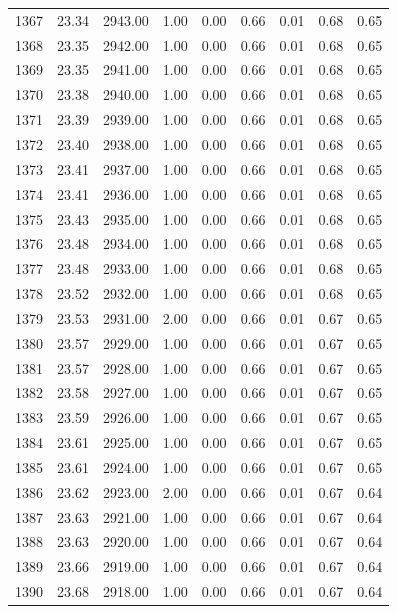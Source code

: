 \documentclass{article}\usepackage[]{graphicx}\usepackage[]{color}
\begin{document}
\begin{longtable}{rrrrrrrrr}
  1367 & 23.34 & 2943.00 & 1.00 & 0.00 & 0.66 & 0.01 & 0.68 & 0.65 \\ 
  1368 & 23.35 & 2942.00 & 1.00 & 0.00 & 0.66 & 0.01 & 0.68 & 0.65 \\ 
  1369 & 23.35 & 2941.00 & 1.00 & 0.00 & 0.66 & 0.01 & 0.68 & 0.65 \\ 
  1370 & 23.38 & 2940.00 & 1.00 & 0.00 & 0.66 & 0.01 & 0.68 & 0.65 \\ 
  1371 & 23.39 & 2939.00 & 1.00 & 0.00 & 0.66 & 0.01 & 0.68 & 0.65 \\ 
  1372 & 23.40 & 2938.00 & 1.00 & 0.00 & 0.66 & 0.01 & 0.68 & 0.65 \\ 
  1373 & 23.41 & 2937.00 & 1.00 & 0.00 & 0.66 & 0.01 & 0.68 & 0.65 \\ 
  1374 & 23.41 & 2936.00 & 1.00 & 0.00 & 0.66 & 0.01 & 0.68 & 0.65 \\ 
  1375 & 23.43 & 2935.00 & 1.00 & 0.00 & 0.66 & 0.01 & 0.68 & 0.65 \\ 
  1376 & 23.48 & 2934.00 & 1.00 & 0.00 & 0.66 & 0.01 & 0.68 & 0.65 \\ 
  1377 & 23.48 & 2933.00 & 1.00 & 0.00 & 0.66 & 0.01 & 0.68 & 0.65 \\ 
  1378 & 23.52 & 2932.00 & 1.00 & 0.00 & 0.66 & 0.01 & 0.68 & 0.65 \\ 
  1379 & 23.53 & 2931.00 & 2.00 & 0.00 & 0.66 & 0.01 & 0.67 & 0.65 \\ 
  1380 & 23.57 & 2929.00 & 1.00 & 0.00 & 0.66 & 0.01 & 0.67 & 0.65 \\ 
  1381 & 23.57 & 2928.00 & 1.00 & 0.00 & 0.66 & 0.01 & 0.67 & 0.65 \\ 
  1382 & 23.58 & 2927.00 & 1.00 & 0.00 & 0.66 & 0.01 & 0.67 & 0.65 \\ 
  1383 & 23.59 & 2926.00 & 1.00 & 0.00 & 0.66 & 0.01 & 0.67 & 0.65 \\ 
  1384 & 23.61 & 2925.00 & 1.00 & 0.00 & 0.66 & 0.01 & 0.67 & 0.65 \\ 
  1385 & 23.61 & 2924.00 & 1.00 & 0.00 & 0.66 & 0.01 & 0.67 & 0.65 \\ 
  1386 & 23.62 & 2923.00 & 2.00 & 0.00 & 0.66 & 0.01 & 0.67 & 0.64 \\ 
  1387 & 23.63 & 2921.00 & 1.00 & 0.00 & 0.66 & 0.01 & 0.67 & 0.64 \\ 
  1388 & 23.63 & 2920.00 & 1.00 & 0.00 & 0.66 & 0.01 & 0.67 & 0.64 \\ 
  1389 & 23.66 & 2919.00 & 1.00 & 0.00 & 0.66 & 0.01 & 0.67 & 0.64 \\ 
  1390 & 23.68 & 2918.00 & 1.00 & 0.00 & 0.66 & 0.01 & 0.67 & 0.64 \\ 

\end{longtable}
\end{document}
